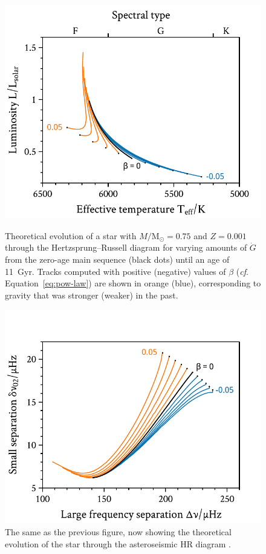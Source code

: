 \documentclass[twocolumn]{aastex63}
\begin{document}
\begin{figure}
    \centering
    \includegraphics[width=\linewidth]{HR.pdf}
    \caption{Theoretical evolution of a star with ${M/\text{M}_\odot=0.75}$ and ${Z=0.001}$ through the Hertzsprung--Russell diagram for varying amounts of ${\dot G}$ from the zero-age main sequence (black dots) until an age of 11~Gyr. 
    Tracks computed with positive (negative) values of $\beta$ (\emph{cf}. Equation~\ref{eq:pow-law}) are shown in orange (blue), corresponding to gravity that was stronger (weaker) in the past. \\[0.5\baselineskip]
    \label{fig:HR}} 
%
    \centering
    \includegraphics[width=\linewidth, trim={0 0 0 1.5cm}, clip]{CD.pdf}
    \caption{The same as the previous figure, now showing the theoretical evolution of the star through the asteroseismic HR diagram \citep{1988IAUS..123..295C}. 
    \label{fig:CD}}
\end{figure}
\end{document}

